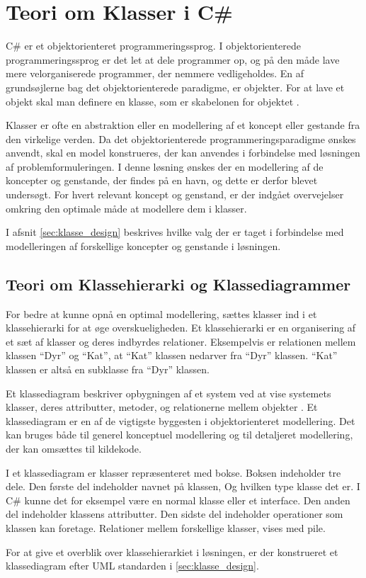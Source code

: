 \section{Teori om Klasser i C\#}
\label{sec:klasse_teori}

C\# er et objektorienteret programmeringssprog. I objektorienterede programmeringssprog er det let at dele programmer op, og på den måde lave mere velorganiserede programmer, der nemmere vedligeholdes. En af grundsøjlerne bag det objektorienterede paradigme, er objekter. For at lave et objekt skal man definere en klasse, som er skabelonen for objektet \cite{michaelis2012essential}. 

Klasser er ofte en abstraktion eller en modellering af et koncept eller gestande fra den virkelige verden. Da det objektorienterede programmeringsparadigme ønskes anvendt, skal en model konstrueres, der kan anvendes i forbindelse med løsningen af problemformuleringen. I denne løsning ønskes der en modellering af de koncepter og genstande, der findes på en havn, og dette er derfor blevet undersøgt. For hvert relevant koncept og genstand, er der indgået overvejelser omkring den optimale måde at modellere dem i klasser.

I afsnit \cref{sec:klasse_design} beskrives hvilke valg der er taget i forbindelse med modelleringen af forskellige koncepter og genstande i løsningen.

\subsection{Teori om Klassehierarki og Klassediagrammer}
\label{sub:uml_teori}

For bedre at kunne opnå en optimal modellering, sættes klasser ind i et klassehierarki for at øge overskueligheden. Et klassehierarki er en organisering af et sæt af klasser og deres indbyrdes relationer. Eksempelvis er relationen mellem klassen \enquote{Dyr} og \enquote{Kat}, at \enquote{Kat} klassen nedarver fra \enquote{Dyr} klassen. \enquote{Kat} klassen er altså en subklasse fra \enquote{Dyr} klassen.

Et klassediagram beskriver opbygningen af et system ved at vise systemets klasser, deres attributter, metoder, og relationerne mellem objekter \cite{martin2006agile}. Et klassediagram er en af de vigtigste byggesten i objektorienteret modellering. Det kan bruges både til generel konceptuel modellering og til detaljeret modellering, der kan omsættes til kildekode. 

I et klassediagram er klasser repræsenteret med bokse. Boksen indeholder tre dele. Den første del indeholder navnet på klassen, Og hvilken type klasse det er. I C\# kunne det for eksempel være en normal klasse eller et interface. Den anden del indeholder klassens attributter. Den sidste del indeholder operationer som klassen kan foretage. Relationer mellem forskellige klasser, vises med pile.

For at give et overblik over klassehierarkiet i løsningen, er der konstrueret et klassediagram efter UML standarden i \cref{sec:klasse_design}.



